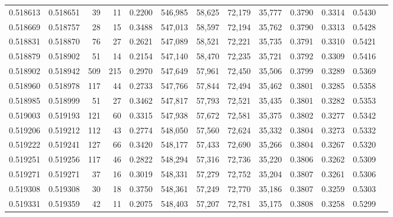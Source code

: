 \begin{tabular}{rrrrrrrrrrrrr}
0.518613 & 0.518651 &    39 &    11 &                                     0.2200 & 546,985 &  58,625 &  72,179 &  35,777 & 0.3790 & 0.3314 & 0.5430 \\
0.518669 & 0.518757 &    28 &    15 &                                     0.3488 & 547,013 &  58,597 &  72,194 &  35,762 & 0.3790 & 0.3313 & 0.5428 \\
0.518831 & 0.518870 &    76 &    27 &                                     0.2621 & 547,089 &  58,521 &  72,221 &  35,735 & 0.3791 & 0.3310 & 0.5421 \\
0.518879 & 0.518902 &    51 &    14 &                                     0.2154 & 547,140 &  58,470 &  72,235 &  35,721 & 0.3792 & 0.3309 & 0.5416 \\
0.518902 & 0.518942 &   509 &   215 &                                     0.2970 & 547,649 &  57,961 &  72,450 &  35,506 & 0.3799 & 0.3289 & 0.5369 \\
0.518960 & 0.518978 &   117 &    44 &                                     0.2733 & 547,766 &  57,844 &  72,494 &  35,462 & 0.3801 & 0.3285 & 0.5358 \\
0.518985 & 0.518999 &    51 &    27 &                                     0.3462 & 547,817 &  57,793 &  72,521 &  35,435 & 0.3801 & 0.3282 & 0.5353 \\
0.519003 & 0.519193 &   121 &    60 &                                     0.3315 & 547,938 &  57,672 &  72,581 &  35,375 & 0.3802 & 0.3277 & 0.5342 \\
0.519206 & 0.519212 &   112 &    43 &                                     0.2774 & 548,050 &  57,560 &  72,624 &  35,332 & 0.3804 & 0.3273 & 0.5332 \\
0.519222 & 0.519241 &   127 &    66 &                                     0.3420 & 548,177 &  57,433 &  72,690 &  35,266 & 0.3804 & 0.3267 & 0.5320 \\
0.519251 & 0.519256 &   117 &    46 &                                     0.2822 & 548,294 &  57,316 &  72,736 &  35,220 & 0.3806 & 0.3262 & 0.5309 \\
0.519271 & 0.519271 &    37 &    16 &                                     0.3019 & 548,331 &  57,279 &  72,752 &  35,204 & 0.3807 & 0.3261 & 0.5306 \\
0.519308 & 0.519308 &    30 &    18 &                                     0.3750 & 548,361 &  57,249 &  72,770 &  35,186 & 0.3807 & 0.3259 & 0.5303 \\
0.519331 & 0.519359 &    42 &    11 &                                     0.2075 & 548,403 &  57,207 &  72,781 &  35,175 & 0.3808 & 0.3258 & 0.5299 \\

\end{tabular}
